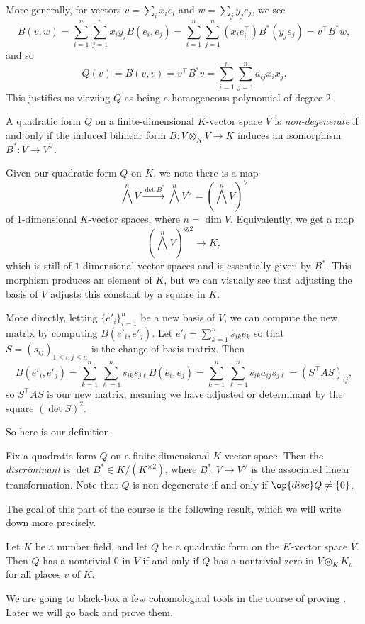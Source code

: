 \documentclass[../notes.tex]{subfiles}
\begin{document}
More generally, for vectors $v=\sum_ix_ie_i$ and $w=\sum_jy_je_j$, we see
\[B(v,w)=\sum_{i=1}^n\sum_{j=1}^nx_iy_jB(e_i,e_j)=\sum_{i=1}^n\sum_{j=1}^n(x_ie_i^\intercal)B^*(y_je_j)=v^\intercal B^*w,\]
and so
\[Q(v)=B(v,v)=v^\intercal B^*v=\sum_{i=1}^n\sum_{j=1}^na_{ij}x_ix_j.\]
This justifies us viewing $Q$ as being a homogeneous polynomial of degree $2$.
\begin{definition}
	A quadratic form $Q$ on a finite-dimensional $K$-vector space $V$ is \textit{non-degenerate} if and only if the induced bilinear form $B\colon V\otimes_KV\to K$ induces an isomorphism $B^*\colon V\to V^\lor$.
\end{definition}
Given our quadratic form $Q$ on $K$, we note there is a map
\[\bigwedge^nV\xrightarrow{\det B^*}\bigwedge^nV^\lor=\left(\bigwedge^nV\right)^\lor\]
of $1$-dimensional $K$-vector spaces, where $n=\dim V$. Equivalently, we get a map
\[\left(\bigwedge^nV\right)^{\otimes2}\to K,\]
which is still of $1$-dimensional vector spaces and is essentially given by $B^*$. This morphism produces an element of $K$, but we can visually see that adjusting the basis of $V$ adjusts this constant by a square in $K$.

More directly, letting $\{e'_i\}_{i=1}^n$ be a new basis of $V$, we can compute the new matrix by computing $B(e'_i,e'_j)$. Let $e'_i=\sum_{k=1}^ns_{ik}e_k$ so that $S=(s_{ij})_{1\le i,j\le n}$ is the change-of-basis matrix. Then
\[B(e'_i,e'_j)=\sum_{k=1}^n\sum_{\ell=1}^ns_{ik}s_{j\ell}B(e_i,e_j)=\sum_{k=1}^n\sum_{\ell=1}^ns_{ik}a_{ij}s_{j\ell}=(S^\intercal AS)_{ij},\]
so $S^\intercal AS$ is our new matrix, meaning we have adjusted or determinant by the square $(\det S)^2$.

So here is our definition.
\begin{definition}[discriminant]
	Fix a quadratic form $Q$ on a finite-dimensional $K$-vector space. Then the \textit{discriminant} is $\det B^*\in K/\left(K^{\times2}\right)$, where $B^*\colon V\to V^\lor$ is the associated linear transformation. Note that $Q$ is non-degenerate if and only if $\op{disc}Q\ne\{0\}$.
\end{definition}
The goal of this part of the course is the following result, which we will write down more precisely.
\begin{theorem} \label{thm:hasse-mink}
	Let $K$ be a number field, and let $Q$ be a quadratic form on the $K$-vector space $V$. Then $Q$ has a nontrivial $0$ in $V$ if and only if $Q$ has a nontrivial zero in $V\otimes_KK_v$ for all places $v$ of $K$.
\end{theorem}
We are going to black-box a few cohomological tools in the course of proving . Later we will go back and prove them.
\end{document}
